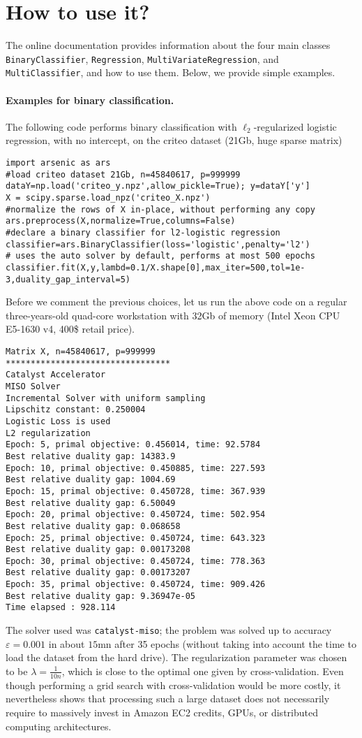 \documentclass{article}
\begin{document}
\section{How to use it?}
The online documentation provides information about the four main classes
\texttt{BinaryClassifier}, \texttt{Regression},
\texttt{MultiVariateRegression}, and \texttt{MultiClassifier}, and how to use
them. Below, we provide simple examples.
\paragraph{Examples for binary classification.}
The following code performs binary classification with $\ell_2$-regularized logistic regression, with no intercept, on the criteo dataset (21Gb, huge sparse matrix)
\begin{verbatim}
import arsenic as ars
#load criteo dataset 21Gb, n=45840617, p=999999
dataY=np.load('criteo_y.npz',allow_pickle=True); y=dataY['y']
X = scipy.sparse.load_npz('criteo_X.npz')
#normalize the rows of X in-place, without performing any copy
ars.preprocess(X,normalize=True,columns=False) 
#declare a binary classifier for l2-logistic regression
classifier=ars.BinaryClassifier(loss='logistic',penalty='l2')
# uses the auto solver by default, performs at most 500 epochs
classifier.fit(X,y,lambd=0.1/X.shape[0],max_iter=500,tol=1e-3,duality_gap_interval=5) 
\end{verbatim}

Before we comment the previous choices, let us 
run the above code on a regular three-years-old quad-core workstation with 32Gb of memory
(Intel Xeon CPU E5-1630 v4, 400\$ retail price). 
\begin{verbatim}
Matrix X, n=45840617, p=999999
*********************************
Catalyst Accelerator
MISO Solver
Incremental Solver with uniform sampling
Lipschitz constant: 0.250004
Logistic Loss is used
L2 regularization
Epoch: 5, primal objective: 0.456014, time: 92.5784
Best relative duality gap: 14383.9
Epoch: 10, primal objective: 0.450885, time: 227.593
Best relative duality gap: 1004.69
Epoch: 15, primal objective: 0.450728, time: 367.939
Best relative duality gap: 6.50049
Epoch: 20, primal objective: 0.450724, time: 502.954
Best relative duality gap: 0.068658
Epoch: 25, primal objective: 0.450724, time: 643.323
Best relative duality gap: 0.00173208
Epoch: 30, primal objective: 0.450724, time: 778.363
Best relative duality gap: 0.00173207
Epoch: 35, primal objective: 0.450724, time: 909.426
Best relative duality gap: 9.36947e-05
Time elapsed : 928.114
\end{verbatim}
The solver used was \texttt{catalyst-miso}; the problem was solved up to
accuracy $\varepsilon=0.001$ in about $15$mn after 35 epochs (without taking into account
the time to load the dataset from the hard drive). The regularization
parameter was chosen to be $\lambda=\frac{1}{10n}$, which is close to the
optimal one given by cross-validation.  Even though performing a grid search with
cross-validation would be more costly, it nevertheless shows that processing such 
a large dataset does not necessarily require to massively invest in Amazon EC2 credits,
GPUs, or distributed computing architectures.
\end{document}
